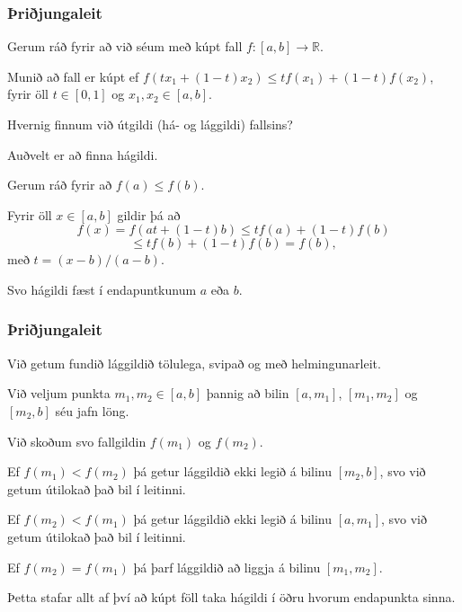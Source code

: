{
	{
		\frametitle{Þriðjungaleit}
		\item<1-> Gerum ráð fyrir að við séum með kúpt fall $f \colon [a, b] \rightarrow \mathbb{R}$.
		\item<2-> Munið að fall er kúpt ef $f(tx_1 + (1 - t)x_2) \leq tf(x_1) + (1 - t)f(x_2)$, fyrir öll $t \in [0, 1]$ og $x_1, x_2 \in [a, b]$.
		\item<3-> Hvernig finnum við útgildi (há- og lággildi) fallsins?
		\item<4-> Auðvelt er að finna hágildi.
		\item<5-> Gerum ráð fyrir að $f(a) \leq f(b)$.
		\item<6-> Fyrir öll $x \in [a, b]$ gildir þá að
		\[
			f(x) = f(at + (1 - t)b) \leq tf(a) + (1 - t)f(b)
		\]
		\[
			\leq tf(b) + (1 - t)f(b) = f(b),
		\]
		með $t = (x - b)/(a - b)$.
		\item<7-> Svo hágildi fæst í endapuntkunum $a$ eða $b$.
	}
}

{
	{
		\frametitle{Þriðjungaleit}
		\item<1-> Við getum fundið lággildið tölulega, svipað og með helmingunarleit.
		\item<2-> Við veljum punkta $m_1, m_2 \in [a, b]$ þannig að bilin $[a, m_1]$, $[m_1, m_2]$ og $[m_2, b]$ séu jafn löng.
		\item<3-> Við skoðum svo fallgildin $f(m_1)$ og $f(m_2)$.
		\item<4-> Ef $f(m_1) < f(m_2)$ þá getur lággildið ekki legið á bilinu $[m_2, b]$, svo við getum útilokað það bil í leitinni.
		\item<5-> Ef $f(m_2) < f(m_1)$ þá getur lággildið ekki legið á bilinu $[a, m_1]$, svo við getum útilokað það bil í leitinni.
		\item<6-> Ef $f(m_2) = f(m_1)$ þá þarf lággildið að liggja á bilinu $[m_1, m_2]$.
		\item<7-> Þetta stafar allt af því að kúpt föll taka hágildi í öðru hvorum endapunkta sinna.
	}
}

